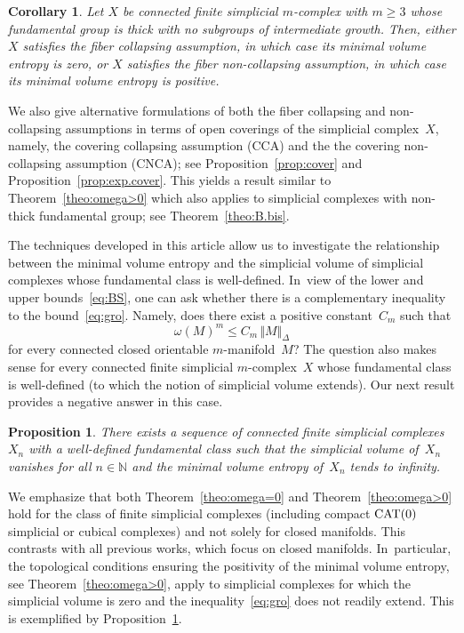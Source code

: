 \documentclass[JEP,XML,SOM,Unicode,NoFloatCountersInSection,published]{cedram}
\newtheorem{proposition}[theorem]{Proposition}
\newtheorem{corollary}[theorem]{Corollary}
\theoremstyle{definition}
\newcommand\N{{\mathbb N}}
\begin{document}
\begin{corollary}
Let $X$ be connected finite simplicial $m$\nobreakdash-complex with $m \geq 3$ whose fundamental group is thick with no subgroups of intermediate growth.
Then, either $X$ satisfies the fiber collapsing assumption, in which case its minimal volume entropy is zero, or $X$ satisfies the fiber non-collapsing assumption, in which case its minimal volume entropy is positive.
\end{corollary}

We also give alternative formulations of both the fiber collapsing and non-collapsing assumptions in terms of open coverings of the simplicial complex~$X$, namely, the covering collapsing assumption (CCA) and the the covering non-collapsing assumption (CNCA); see Proposition~\ref{prop:cover} and Proposition~\ref{prop:exp.cover}.
This yields a result similar to Theorem~\ref{theo:omega>0} which also applies to simplicial complexes with non-thick fundamental group; see Theorem~\ref{theo:B.bis}.

The techniques developed in this article allow us to investigate the relationship between the minimal volume entropy and the simplicial volume of simplicial complexes whose fundamental class is well-defined. In~view of the lower and upper bounds~\eqref{eq:BS}, one can ask whether there is a complementary inequality to the bound~\eqref{eq:gro}.
Namely, does there exist a positive constant~$C_m$ such that
\[
\omega(M)^m \leq C_m \, \Vert M \Vert_\Delta
\]
for every connected closed orientable $m$\nobreakdash-manifold~$M$?
The question also makes sense for every connected finite simplicial $m$\nobreakdash-complex~$X$ whose fundamental class is well-defined (to which the notion of simplicial volume extends).
Our next result provides a negative answer in this case.

\begin{proposition} \label{prop:ex}
There exists a sequence of connected finite simplicial complexes~$X_n$ with a well-defined fundamental class such that the simplicial volume of~$X_n$ vanishes for all $n \in \N$ and the minimal volume entropy of~$X_n$ tends to infinity.
\end{proposition}

We emphasize that both Theorem~\ref{theo:omega=0} and Theorem~\ref{theo:omega>0} hold for the class of finite simplicial complexes (including compact ${\rm CAT}(0)$ simplicial or cubical complexes) and not solely for closed manifolds.
This contrasts with all previous works, which focus on closed manifolds. In~particular, the topological conditions ensuring the positivity of the minimal volume entropy, see Theorem~\ref{theo:omega>0}, apply to simplicial complexes for which the simplicial volume is zero and the inequality~\eqref{eq:gro} does not readily extend.
This is exemplified by Proposition~\ref{prop:ex}.
\end{document}
